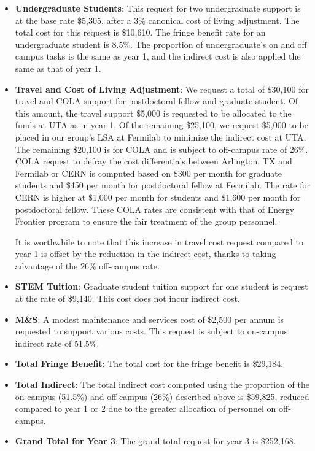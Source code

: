\begin{enumerate}
\begin{itemize}[noitemsep,nolistsep]
\item {{\bf Undergraduate Students}: This request for two undergraduate support is at the base rate \$5,305, after a 3\% canonical cost of living adjustment.  The total cost for this request is \$10,610.  The fringe benefit rate for an undergraduate student is 8.5\%.  The proportion of undergraduate’s on and off campus tasks is the same as year 1, and the indirect cost is also applied the same as that of year 1.}

\item{{\bf Travel and Cost of Living Adjustment}: We request a total of \$30,100 for travel and COLA support for postdoctoral fellow and graduate student.   Of this amount, the travel support \$5,000 is requested to be allocated to the funds at UTA as in year 1.  Of the remaining \$25,100, we request \$5,000 to be placed in our group’s LSA at Fermilab to minimize the indirect cost at UTA.   The remaining \$20,100 is for COLA and is subject to off-campus rate of 26\%.  COLA request to defray the cost differentials between Arlington, TX and Fermilab or CERN is computed based on \$300 per month for graduate students and \$450 per month for postdoctoral fellow at Fermilab.  The rate for CERN is higher at \$1,000 per month for students and \$1,600 per month for postdoctoral fellow.  These COLA rates are consistent with that of Energy Frontier program to ensure the fair treatment of the group personnel.  

It is worthwhile to note that this increase in travel cost request compared to year 1 is offset by the reduction in the indirect cost, thanks to taking advantage of the 26\% off-campus rate.}

\item {{\bf STEM Tuition}: Graduate student tuition support for one student is request at the rate of \$9,140.  This cost does not incur indirect cost.}

\item {{\bf M\&S}: A modest maintenance and services cost of \$2,500 per annum is requested to support various costs.   This request is subject to on-campus indirect rate of 51.5\%.}

\item {{\bf Total Fringe Benefit}: The total cost for the fringe benefit is \$29,184.}

\item {{\bf Total Indirect}: The total indirect cost computed using the proportion of the on-campus (51.5\%) and off-campus (26\%) described above is \$59,825, reduced compared to year 1 or 2 due to the greater allocation of personnel on off-campus.}

\item {{\bf Grand Total for Year 3}: The grand total request for year 3 is \$252,168.}

\end{itemize}

\end{enumerate}

